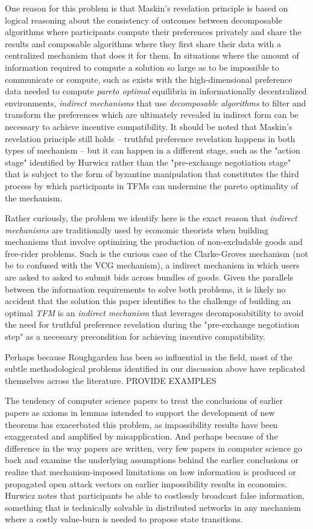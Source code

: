 \documentclass[sigconf,anonymous]{aamas}
\begin{document}
One reason for this problem is that Maskin's revelation principle is based on logical reasoning about the consistency of outcomes between decomposable algorithms where participants compute their preferences privately and share the results and composable algorithms where they first share their data with a centralized mechanism that does it for them. In situations where the amount of information required to compute a solution so large as to be impossible to communicate or compute, such as exists with the high-dimensional preference data needed to compute \textit{pareto optimal} equilibria in informationally decentralized environments, \textit{indirect mechanisms} that use \textit{decomposable algorithms} to filter and transform the preferences which are ultimately revealed in indirect form can be necessary to achieve incentive compatibility. It should be noted that Maskin's revelation principle still holds -- truthful preference revelation happens in both types of mechanism -- but it can happen in a different stage, such as the "action stage" identified by Hurwicz rather than the "pre-exchange negotiation stage" that is subject to the form of byzantine manipulation that constitutes the third process by which participants in TFMs can undermine the pareto optimality of the mechanism.

Rather curiously, the problem we identify here is the exact reason that \textit{indirect mechanisms} are traditionally used by economic theorists when building mechanisms that involve optimizing the production of non-excludable goods and free-rider problems. Such is the curious case of the Clarke-Groves mechanism (not be to confused with the VCG mechanism), a indirect mechanism in which users are asked to asked to submit bids across bundles of goods. Given the parallels between the information requirements to solve both problems, it is likely no accident that the solution this paper identifies to the challenge of building an optimal \textit{TFM} is an \textit{indirect mechanism} that leverages decomposabitility to avoid the need for truthful preference revelation during the "pre-exchange negotiation step" as a necessary precondition for achieving incentive compatibility.

Perhaps because Roughgarden has been so influential in the field, most of the subtle methodological problems identified in our discussion above have replicated themselves across the literature. PROVIDE EXAMPLES

The tendency of computer science papers to treat the conclusions of earlier papers as axioms in lemmas intended to support the development of new theorems has exacerbated this problem, as impossibility results have been exaggerated and amplified by misapplication. And perhaps because of the difference in the way papers are written, very few papers in computer science go back and examine the underlying assumptions behind the earlier conclusions or realize that mechanism-imposed limitations on how information is produced or propagated open attack vectors on earlier impossibility results in economics. Hurwicz notes that participants be able to costlessly broadcast false information, something that is technically solvable in distributed networks in any mechanism where a costly value-burn is needed to propose state transitions.
\end{document}
